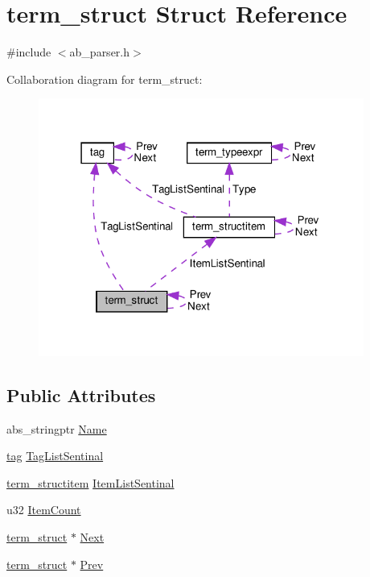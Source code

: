 \hypertarget{structterm__struct}{}\section{term\+\_\+struct Struct Reference}
\label{structterm__struct}


{\ttfamily \#include $<$ab\+\_\+parser.\+h$>$}



Collaboration diagram for term\+\_\+struct\+:
\nopagebreak
\begin{figure}[H]
\begin{center}
\leavevmode
\includegraphics[width=303pt]{df/d72/structterm__struct__coll__graph}
\end{center}
\end{figure}
\subsection*{Public Attributes}
\begin{DoxyCompactItemize}
\item 
abs\+\_\+stringptr \hyperlink{structterm__struct_a89d9cb121c9adf97d79fe1a2304c672a}{Name}
\item 
\hyperlink{structtag}{tag} \hyperlink{structterm__struct_a95c474434ab1c1d7e1ac66df37592d68}{Tag\+List\+Sentinal}
\item 
\hyperlink{structterm__structitem}{term\+\_\+structitem} \hyperlink{structterm__struct_a0983a4cdc7024100a2f870b0d484a99d}{Item\+List\+Sentinal}
\item 
u32 \hyperlink{structterm__struct_a7346270cfcb97d2aba636aaccf0a35be}{Item\+Count}
\item 
\hyperlink{structterm__struct}{term\+\_\+struct} $\ast$ \hyperlink{structterm__struct_a733a9fd60e2c6d6dd108fe88e18a8cb8}{Next}
\item 
\hyperlink{structterm__struct}{term\+\_\+struct} $\ast$ \hyperlink{structterm__struct_aa5cc89c03d6af0b5a43680485f5224cb}{Prev}
\end{DoxyCompactItemize}


